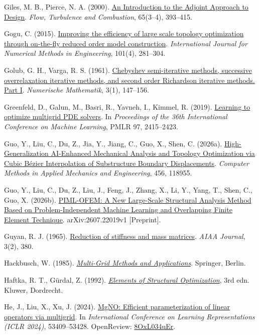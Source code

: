 \documentclass[preprint,12pt,authoryear]{elsarticle}
\begin{document}
Giles, M. B., Pierce, N. A. (2000). \href{https://doi.org/10.1023/a:1011430410075}{An Introduction to the Adjoint Approach to Design}. \emph{Flow, Turbulence and Combustion}, 65(3--4), 393--415.

Gogu, C. (2015). \href{https://doi.org/10.1002/nme.4797}{Improving the efficiency of large scale topology optimization through on-the-fly reduced order model construction}. \emph{International Journal for Numerical Methods in Engineering}, 101(4), 281--304.

Golub, G. H., Varga, R. S. (1961). \href{https://doi.org/10.1007/BF01386013}{Chebyshev semi-iterative methods, successive overrelaxation iterative methods, and second order Richardson iterative methods. Part I}. \emph{Numerische Mathematik}, 3(1), 147--156.

Greenfeld, D., Galun, M., Basri, R., Yavneh, I., Kimmel, R. (2019). \href{https://proceedings.mlr.press/v97/greenfeld19a.html}{Learning to optimize multigrid PDE solvers}. In \emph{Proceedings of the 36th International Conference on Machine Learning}, PMLR 97, 2415--2423.

Guo, Y., Liu, C., Du, Z., Jia, Y., Jiang, C., Guo, X., Shen, C. (2026a). \href{https://doi.org/10.1016/j.cma.2026.118955}{High-Generalization AI-Enhanced Mechanical Analysis and Topology Optimization via Cubic Bézier Interpolation of Substructure Boundary Displacements}. \emph{Computer Methods in Applied Mechanics and Engineering}, 456, 118955.

Guo, Y., Liu, C., Du, Z., Liu, J., Feng, J., Zhang, X., Li, Y., Yang, T., Shen, C., Guo, X. (2026b). \href{https://arxiv.org/abs/2607.22019v1}{PIML-OFEM: A New Large-Scale Structural Analysis Method Based on Problem-Independent Machine Learning and Overlapping Finite Element Technique}. arXiv:2607.22019v1 {[}Preprint{]}.

Guyan, R. J. (1965). \href{https://doi.org/10.2514/3.2874}{Reduction of stiffness and mass matrices}. \emph{AIAA Journal}, 3(2), 380.

Hackbusch, W. (1985). \href{https://doi.org/10.1007/978-3-662-02427-0}{\emph{Multi-Grid Methods and Applications}}. Springer, Berlin.

Haftka, R. T., Gürdal, Z. (1992). \href{https://doi.org/10.1007/978-94-011-2550-5}{\emph{Elements of Structural Optimization}}, 3rd edn. Kluwer, Dordrecht.

He, J., Liu, X., Xu, J. (2024). \href{https://proceedings.iclr.cc/paper_files/paper/2024/hash/eb3c8135137c8a60425a0320869ad87e-Abstract-Conference.html}{MgNO: Efficient parameterization of linear operators via multigrid}. In \emph{International Conference on Learning Representations (ICLR 2024)}, 53409--53428. OpenReview: \href{https://openreview.net/forum?id=8OxL034uEr}{8OxL034uEr}.
\end{document}
